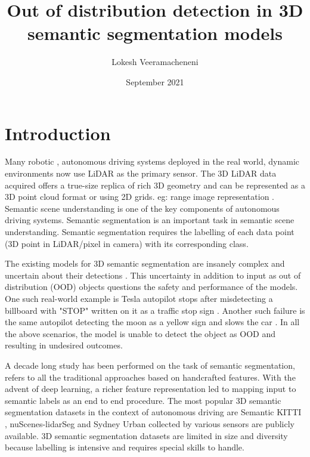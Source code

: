 \documentclass[thesis]{mas_proposal}
\title{Out of distribution detection in 3D semantic segmentation models}
\author{Lokesh Veeramacheneni}
\date{September 2021}
\begin{document}
\maketitle

\pagestyle{plain}

\section{Introduction}
Many robotic \cite{thrun2006stanley} \cite{patz2008practical}, autonomous driving \cite{li2016vehicle} systems deployed in the real world, dynamic environments now use LiDAR as the primary sensor.
The 3D LiDAR data acquired offers a true-size replica of rich 3D geometry and can be represented as a 3D point cloud format or using 2D grids. eg: range image representation \cite{Milioto2019}.
Semantic scene understanding is one of the key components of autonomous driving systems. 
Semantic segmentation is an important task in semantic scene understanding.
Semantic segmentation requires the labelling of each data point (3D point in LiDAR/pixel in camera) with its corresponding class.

The existing models for 3D semantic segmentation are insanely complex and uncertain about their detections \cite{bhandary2020evaluating}. 
This uncertainty in addition to input as out of distribution (OOD) objects questions the safety and performance of the models.
One such real-world example is Tesla autopilot stops after misdetecting a billboard with "STOP" written on it as a traffic stop sign \cite{tesla_fails}. 
Another such failure is the same autopilot detecting the moon as a yellow sign and slows the car \cite{tesla_fails}.
In all the above scenarios, the model is unable to detect the object as OOD and resulting in undesired outcomes.

A decade long study has been performed on the task of semantic segmentation, \cite{ZHU201612} refers to all the traditional approaches based on handcrafted features.
With the advent of deep learning, a richer feature representation led to mapping input to semantic labels as an end to end procedure.
The most popular 3D semantic segmentation datasets in the context of autonomous driving are Semantic KITTI \cite{Behley_2019_ICCV}, nuScenes-lidarSeg \cite{caesar2020nuscenes} and Sydney Urban \cite{de2013unsupervised} collected by various sensors are publicly available.
3D semantic segmentation datasets are limited in size and diversity because labelling is intensive and requires special skills to handle.
\end{document}
